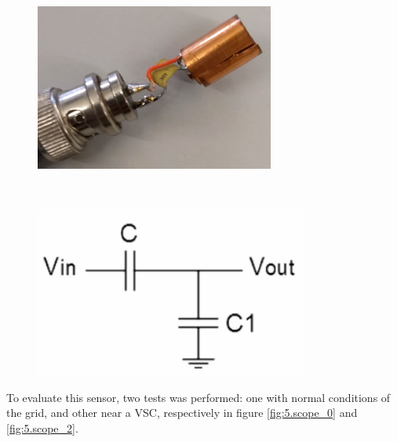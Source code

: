 	
	
	\begin{figure}[h!]
		\centering
		\begin{minipage}{.45\textwidth}
			\centering
			\includegraphics[width=0.7\textwidth,keepaspectratio]{figures/50.PreliminaryW/voltage_sensor}
			\label{fig:5.voltage_sensor}
		\end{minipage}%
		\begin{minipage}{.03\textwidth}  ~\end{minipage}	
		\begin{minipage}{.45\textwidth}
			\centering
			\includegraphics[width=0.8\textwidth,keepaspectratio]{figures/50.PreliminaryW/voltage_sensor_eq}
			\label{fig:5.voltage_sensor_eq}
		\end{minipage}
	\end{figure}

	
	To evaluate this sensor, two tests was performed: one with normal conditions of the grid, and other near a \ac{VSC}, respectively in figure \ref{fig:5.scope_0} and \ref{fig:5.scope_2}.
	
